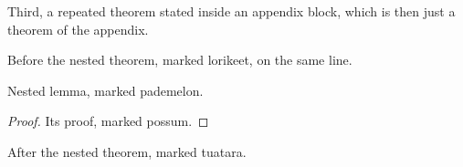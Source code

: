 \documentclass{article}
\begin{document}
Third, a repeated theorem stated inside an appendix block, which is then
just a theorem of the appendix.

\begin{toappendix}
  Before the nested theorem, marked lorikeet, on the same line.
  \begin{lemmarep}
    Nested lemma, marked pademelon.
  \end{lemmarep}
  \begin{proof}
    Its proof, marked possum.
  \end{proof}
  After the nested theorem, marked tuatara.
\end{toappendix}


\end{document}
